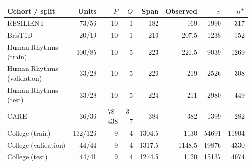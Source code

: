 \begin{tabular*}{\linewidth}{@{\extracolsep{\fill}}lrrrrrrr@{}}
\toprule
Cohort / split & Units & $P$ & $Q$ & Span & Observed & $n$ & $n^+$ \\
\midrule
RESILIENT & 73/56 & 10 & 1 & 182 & 169 & 1990 & 317 \\
BrisT1D & 20/19 & 10 & 1 & 210 & 207.5 & 1238 & 152 \\
Human Rhythms (train) & 100/85 & 10 & 5 & 223 & 221.5 & 9039 & 1269 \\
Human Rhythms (validation) & 33/28 & 10 & 5 & 220 & 219 & 2526 & 308 \\
Human Rhythms (test) & 33/28 & 10 & 5 & 224 & 211 & 2980 & 449 \\
CARE & 36/36 & 78--438 & 3--7 & 384 & 382 & 1399 & 282 \\
College (train) & 132/126 & 9 & 4 & 1304.5 & 1130 & 54691 & 11904 \\
College (validation) & 44/44 & 9 & 4 & 1317.5 & 1148.5 & 19876 & 4330 \\
College (test) & 44/41 & 9 & 4 & 1274.5 & 1120 & 15137 & 4074 \\
\bottomrule
\end{tabular*}